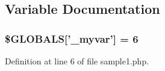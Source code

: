 \subsection{\-Variable \-Documentation}
\hypertarget{sample1_8php_af57fd0dc3f93457714d80dc8f32477a3}{
\subsubsection[{\$\-G\-L\-O\-B\-A\-L\-S}]{\setlength{\rightskip}{0pt plus 5cm}\$\-G\-L\-O\-B\-A\-L\-S\mbox{[}'\-\_\-myvar'\mbox{]} = 6}}\label{sample1_8php_af57fd0dc3f93457714d80dc8f32477a3}


\-Definition at line 6 of file sample1.\-php.

